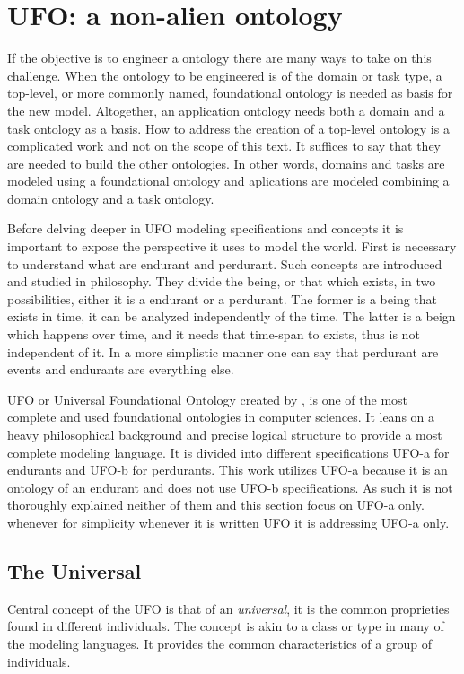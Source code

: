 \section{UFO: a non-alien ontology} 

If the objective is to engineer a ontology there are many ways to take on this challenge. When the ontology to be engineered is of the domain or task type, a top-level, or more commonly named, foundational ontology is needed as basis for the new model. Altogether, an application ontology needs both a domain and a task ontology as a basis. How to address the creation of a top-level ontology is a complicated work and not on the scope of this text. It suffices to say that they are needed to build the other ontologies. In other words, domains and tasks are modeled using a foundational ontology and aplications are modeled combining a domain ontology and a task ontology.

Before delving deeper in UFO modeling specifications and concepts it is important to expose the perspective it uses to model the world. First is necessary to understand what are endurant and perdurant. Such concepts are introduced and studied in philosophy. They divide the being, or that which exists, in two possibilities, either it is a endurant or a perdurant. The former is a being that exists in time, it can be analyzed independently of the time. The latter is a beign which happens over time, and it needs that time-span to exists, thus is not independent of it. In a more simplistic manner one can say that perdurant are events and endurants are everything else. 

UFO or Universal Foundational Ontology created by \cite{guizzardi_ontological_2005}, is one of the most complete and used foundational ontologies in computer sciences. It leans on a heavy philosophical background and precise logical structure to provide a most complete modeling language. It is divided into different specifications UFO-a for endurants and UFO-b for perdurants. This work utilizes UFO-a because it is an ontology of an endurant and does not use UFO-b specifications. As such it is not thoroughly explained neither of them and this section focus on UFO-a only. whenever for simplicity whenever it is written UFO it is addressing UFO-a only.

\subsection{The Universal}

Central concept of the UFO is that of an \textit{universal}, it is the common proprieties found in different individuals. The concept is akin to a class or type in many of the modeling languages. It provides the common characteristics of a group of individuals. 

